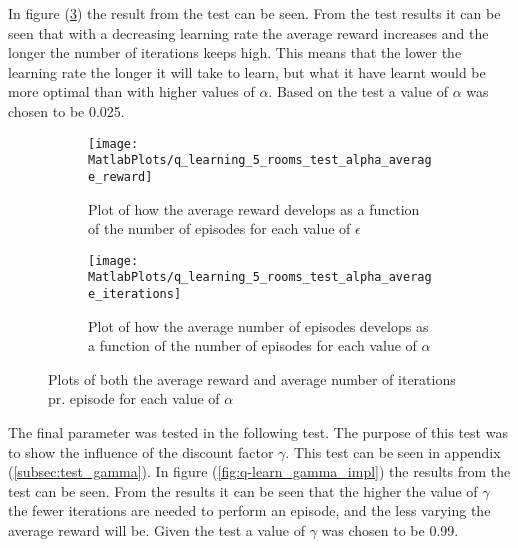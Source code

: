 \documentclass[../Head/Main.tex]{subfiles}
\begin{document}
In figure (\ref{fig:q-learn_alpha_impl}) the result from the test can be seen. From the test results it can be seen that with a decreasing learning rate the average reward increases and the longer the number of iterations keeps high. This means that the lower the learning rate the longer it will take to learn, but what it have learnt would be more optimal than with higher values of $\alpha$. Based on the test  a value of $\alpha$ was chosen to be 0.025.
\begin{figure}[H]
	\centering
	\begin{subfigure}[b]{0.49\textwidth}
		\centering
		\texttt{[image: MatlabPlots/q\_learning\_5\_rooms\_test\_alpha\_average\_reward]}
		\caption{Plot of how the average reward develops as a function of the number of episodes for each value of $\epsilon$}
		\label{fig:q-learn_alpha_reward_impl}
	\end{subfigure}
	\hfill
	\begin{subfigure}[b]{0.49\textwidth}
		\centering
		\texttt{[image: MatlabPlots/q\_learning\_5\_rooms\_test\_alpha\_average\_iterations]}
		\caption{Plot of how the average number of episodes develops as a function of the number of episodes for each value of $\alpha$}
		\label{fig:q-learn_alpha_iterations_impl}
	\end{subfigure}
	\caption{Plots of both the average reward and average number of iterations pr. episode for each value of $\alpha$}
	\label{fig:q-learn_alpha_impl}
\end{figure}

\clearpage
The final parameter was tested in the following test. The purpose of this test was to show the influence of the discount factor $\gamma$. This test can be seen in appendix (\ref{subsec:test_gamma}). In figure (\ref{fig:q-learn_gamma_impl}) the results from the test can be seen. From the results it can be seen that the higher the value of $\gamma$ the fewer iterations are needed to perform an episode, and the less varying the average reward will be. Given the test a value of $\gamma$ was chosen to be 0.99.
\end{document}
